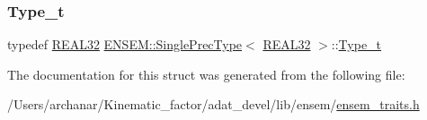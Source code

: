 \mbox{\label{structENSEM_1_1SinglePrecType_3_01REAL32_01_4_a57e2eac17849fab0603ae555b6a2139b}} 
\subsubsection{\texorpdfstring{Type\_t}{Type\_t}\hspace{0.1cm}{\footnotesize\ttfamily [2/2]}}
{\footnotesize\ttfamily typedef \mbox{\hyperlink{namespaceENSEM_a7540d01191172323e9073283d772576d}{R\+E\+A\+L32}} \mbox{\hyperlink{structENSEM_1_1SinglePrecType}{E\+N\+S\+E\+M\+::\+Single\+Prec\+Type}}$<$ \mbox{\hyperlink{namespaceENSEM_a7540d01191172323e9073283d772576d}{R\+E\+A\+L32}} $>$\+::\mbox{\hyperlink{structENSEM_1_1SinglePrecType_3_01REAL32_01_4_a57e2eac17849fab0603ae555b6a2139b}{Type\+\_\+t}}}



The documentation for this struct was generated from the following file\+:\begin{DoxyCompactItemize}
\item 
/\+Users/archanar/\+Kinematic\+\_\+factor/adat\+\_\+devel/lib/ensem/\mbox{\hyperlink{lib_2ensem_2ensem__traits_8h}{ensem\+\_\+traits.\+h}}\end{DoxyCompactItemize}
